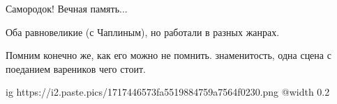  
 
 
 
 
\zzSecCmt

\begin{itemize} %
Самородок! Вечная память...


Оба равновеликие (с Чаплиным), но работали в разных жанрах.

Помним конечно же, как его можно не помнить. знаменитость, одна сцена с поеданием вареников чего стоит.


\ifcmt
  ig https://i2.paste.pics/1717446573fa5519884759a7564f0230.png
  @width 0.2
\fi

\end{itemize} %
